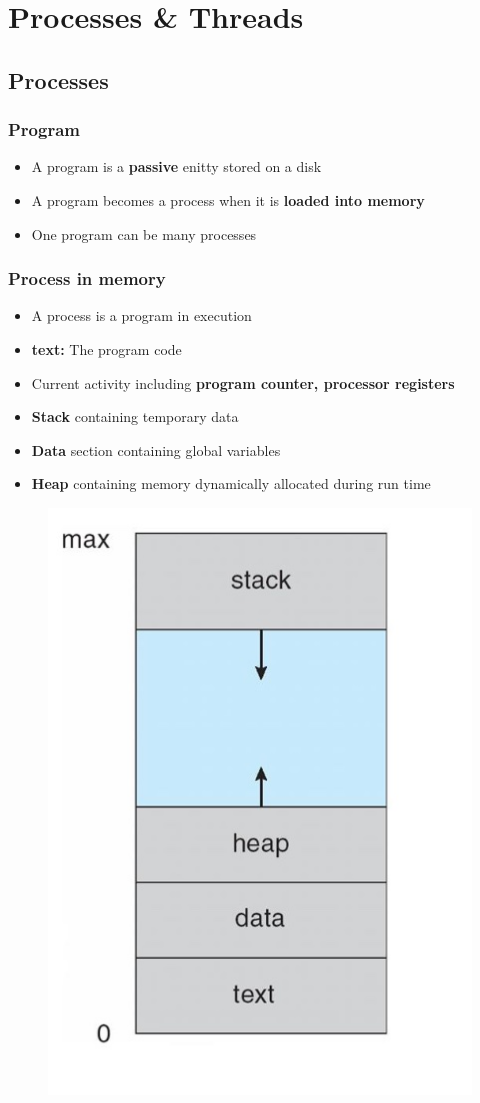 \documentclass[11pt]{article}
\theoremstyle{definition}
\begin{document}
    \section{Processes \& Threads}
        \subsection{Processes}
        \subsubsection{Program}
        \begin{itemize}
            \item A program is a \textbf{passive} enitty stored on a disk
            \item A program becomes a process when it is \textbf{loaded into memory}
            \item One program can be many processes
        \end{itemize}
        \subsubsection{Process in memory}
        \begin{itemize}
            \item A process is a program in execution
            \item \textbf{text:} The program code
            \item Current activity including \textbf{program counter, processor registers}
            \item \textbf{Stack} containing temporary data
            \item \textbf{Data} section containing global variables
            \item \textbf{Heap} containing memory dynamically allocated during run time
        \end{itemize}
            \begin{figure}[htbp]
            \centering
                \includegraphics[width=0.30\linewidth]{Operating System/img/process_in_memory.jpg}
                \label{fig:enter-label}
            \end{figure}
\end{document}
